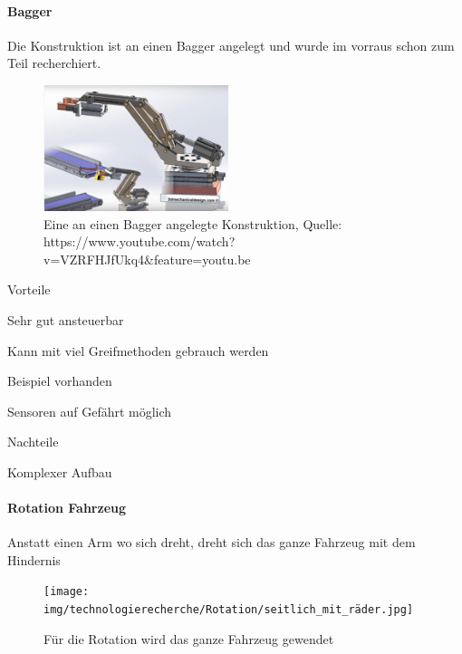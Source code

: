 \paragraph{Bagger}
Die Konstruktion ist an einen Bagger angelegt und wurde im vorraus schon zum Teil recherchiert.

\begin{figure}[h!]
        \centering
        \includegraphics[width=0.48\textwidth]{img/technologierecherche/Rotation/kran.jpg}
        \caption{Eine an einen Bagger angelegte Konstruktion, Quelle: https://www.youtube.com/watch?v=VZRFHJfUkq4\&feature=youtu.be} 
        \label{img:tech_kran}
\end{figure}
\begin{minipage}[t]{0.48\textwidth}
    \begin{items}
          \item [Vorteile]
          \item Sehr gut ansteuerbar
          \item Kann mit viel Greifmethoden gebrauch werden
          \item Beispiel vorhanden
          \item Sensoren auf Gefährt möglich
    \end{items}
\end{minipage}
\hfill
\begin{minipage}[t]{0.48\textwidth}
    \begin{items}
          \item [Nachteile]
          \item Komplexer Aufbau
    \end{items}
\end{minipage}
\newpage
\paragraph{Rotation Fahrzeug}
Anstatt einen Arm wo sich dreht, dreht sich das ganze Fahrzeug mit dem Hindernis

\begin{figure}[h!]
        \centering
        \texttt{[image: img/technologierecherche/Rotation/seitlich\_mit\_räder.jpg]}
        \caption{Für die Rotation wird das ganze Fahrzeug gewendet}
        \label{img:tech_seitlich_mit_räder}
\end{figure}

